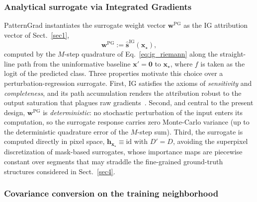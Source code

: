 \documentclass[pdflatex,sn-mathphys-num]{sn-jnl}
\theoremstyle{thmstyleone}
\theoremstyle{thmstyletwo}%
\theoremstyle{thmstylethree}%
\begin{document}
\subsubsection{Analytical surrogate via Integrated Gradients}

PatternGrad instantiates the surrogate weight vector $\mathbf{w}^{\text{PG}}$ as the IG attribution vector of Sect.~\ref{sec1},
\begin{equation}
    \mathbf{w}^{\text{PG}} \mathrel{:=} \hat{\mathbf{s}}^{\text{IG}}(\mathbf{x}_\star),
    \label{eq:pg_surrogate}
\end{equation}
computed by the $M$-step quadrature of Eq.~\eqref{eq:ig_riemann} along the straight-line path from the uninformative baseline $\mathbf{x}' = \mathbf{0}$ to $\mathbf{x}_\star$, where $f$ is taken as the logit of the predicted class. Three properties motivate this choice over a perturbation-regression surrogate. First, IG satisfies the axioms of \emph{sensitivity} and \emph{completeness}, and its path accumulation renders the attribution robust to the output saturation that plagues raw gradients~\cite{sundararajan2017}. Second, and central to the present design, $\mathbf{w}^{\text{PG}}$ is \emph{deterministic}: no stochastic perturbation of the input enters its computation, so the surrogate response carries zero Monte-Carlo variance (up to the deterministic quadrature error of the $M$-step sum). Third, the surrogate is computed directly in pixel space, $\mathbf{h}_{\mathbf{x}_\star} \equiv \mathrm{id}$ with $D' = D$, avoiding the superpixel discretization of mask-based surrogates, whose importance maps are piecewise constant over segments that may straddle the fine-grained ground-truth structures considered in Sect.~\ref{sec4}.

\subsubsection{Covariance conversion on the training neighborhood}
\end{document}
